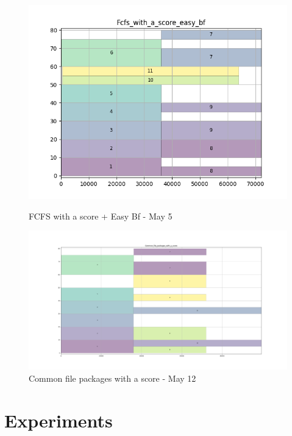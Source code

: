 \documentclass[a4paper]{article}
\begin{document}
\begin{figure}[H]
\begin{minipage}[b]{0.5\linewidth}
    \centering
    \includegraphics[width=1.11\linewidth]{MBSS/plot/Gantt_charts/test/Fcfs_with_a_score_easy_bf.png} 
    \caption{FCFS with a score + Easy Bf - May 5} 
    \vspace{4ex}
  \end{minipage}%
  \begin{minipage}[b]{0.5\linewidth}
    \centering
    \includegraphics[width=1.11\linewidth]{MBSS/plot/Gantt_charts/test/Common_file_packages_with_a_score.png} 
    \caption{Common file packages with a score - May 12} 
    \vspace{4ex}
  \end{minipage}
\end{figure}

\section{Experiments}
		
\end{document}
